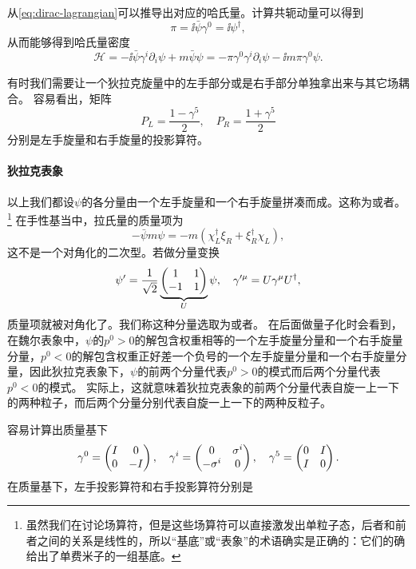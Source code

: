 从\eqref{eq:dirac-lagrangian}可以推导出对应的哈氏量。计算共轭动量可以得到
\begin{equation}
    \pi = \ii \bar{\psi} \gamma^0 = \ii \psi^\dagger,
\end{equation}
从而能够得到哈氏量密度
\begin{equation}
    \mathcal{H} = - \ii \bar{\psi} \gamma^i \partial_i \psi  + m \bar{\psi} \psi = - \pi \gamma^0 \gamma^i \partial_i \psi - \ii m \pi \gamma^0 \psi.
    \label{eq:dirac-hamiltonian}
\end{equation}

有时我们需要让一个狄拉克旋量中的左手部分或是右手部分单独拿出来与其它场耦合。
容易看出，矩阵
\begin{equation}
    P_L = \frac{1 - \gamma^5}{2}, \quad P_R = \frac{1 + \gamma^5}{2}
\end{equation}
分别是左手旋量和右手旋量的投影算符。

\paragraph{狄拉克表象} 以上我们都设$\psi$的各分量由一个左手旋量和一个右手旋量拼凑而成。这称为或者。%
\footnote{
    虽然我们在讨论场算符，但是这些场算符可以直接激发出单粒子态，后者和前者之间的关系是线性的，所以“基底”或“表象”的术语确实是正确的：它们的确给出了单费米子的一组基底。
}%
在手性基当中，拉氏量的质量项为
\[
    - \bar{\psi} m \psi = - m (\chi_L^\dagger \xi_R + \xi_R^\dagger \chi_L),
\]
这不是一个对角化的二次型。若做分量变换
\begin{equation}
    \psi' = \frac{1}{\sqrt{2}} \underbrace{\pmqty{1 & 1 \\ -1 & 1}}_{U} \psi, \quad \gamma'^\mu = U \gamma^\mu U^\dagger,
\end{equation}
质量项就被对角化了。我们称这种分量选取为或者。
在后面做量子化时会看到，在魏尔表象中，$\psi$的$p^0 > 0$的解包含权重相等的一个左手旋量分量和一个右手旋量分量，$p^0 < 0$的解包含权重正好差一个负号的一个左手旋量分量和一个右手旋量分量，因此狄拉克表象下，$\psi$的前两个分量代表$p^0 > 0$的模式而后两个分量代表$p^0 < 0$的模式。
实际上，这就意味着狄拉克表象的前两个分量代表自旋一上一下的两种粒子，而后两个分量分别代表自旋一上一下的两种反粒子。

容易计算出质量基下
\begin{equation}
    \gamma^0 = \pmqty{I & 0 \\ 0 & -I}, \quad \gamma^i = \pmqty{0 & \sigma^i \\ - \sigma^i & 0 }, \quad \gamma^5 = \pmqty{0 & I \\ I & 0}.
\end{equation}
在质量基下，左手投影算符和右手投影算符分别是

